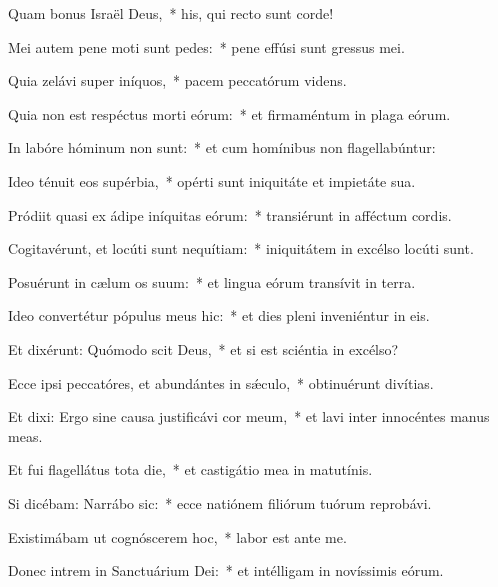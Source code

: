 \item Quam bonus Israël Deus,~* his, qui recto sunt corde!

\item Mei autem pene moti sunt pedes:~* pene effúsi sunt gressus mei.

\item Quia zelávi super iníquos,~* pacem peccatórum videns.

\item Quia non est respéctus morti eórum:~* et firmaméntum in plaga eórum.

\item In labóre hóminum non sunt:~* et cum homínibus non flagellabúntur:

\item Ideo ténuit eos supérbia,~* opérti sunt iniquitáte et impietáte sua.

\item Pródiit quasi ex ádipe iníquitas eórum:~* transiérunt in afféctum cordis.

\item Cogitavérunt, et locúti sunt nequítiam:~* iniquitátem in excélso locúti sunt.

\item Posuérunt in cælum os suum:~* et lingua eórum transívit in terra.

\item Ideo convertétur pópulus meus hic:~* et dies pleni inveniéntur in eis.

\item Et dixérunt: Quómodo scit Deus,~* et si est sciéntia in excélso?

\item Ecce ipsi peccatóres, et abundántes in sǽculo,~* obtinuérunt divítias.

\item Et dixi: Ergo sine causa justificávi cor meum,~* et lavi inter innocéntes manus meas.

\item Et fui flagellátus tota die,~* et castigátio mea in matutínis.

\item Si dicébam: Narrábo sic:~* ecce natiónem filiórum tuórum reprobávi.

\item Existimábam ut cognóscerem hoc,~* labor est ante me.

\item Donec intrem in Sanctuárium Dei:~* et intélligam in novíssimis eórum.

